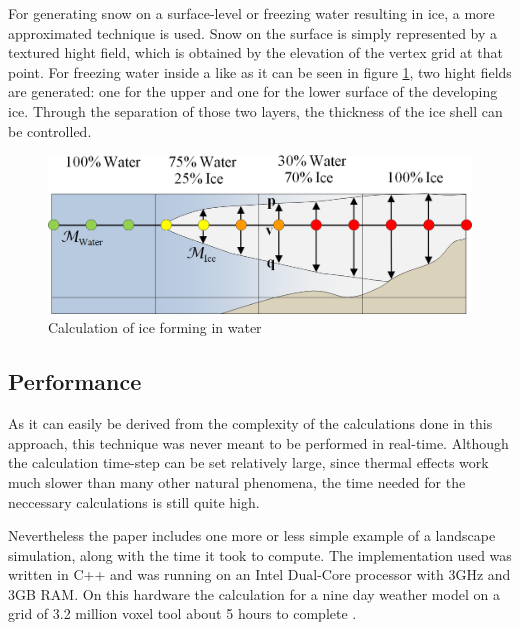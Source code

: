 For generating snow on a surface-level or freezing water resulting in ice, a more approximated technique is used. Snow on the surface is simply represented by a textured hight field, which is obtained by the elevation of the vertex grid at that point. For freezing water inside a like as it can be seen in figure \ref{fig:iceinwater}, two hight fields are generated: one for the upper and one for the lower surface of the developing ice. Through the separation of those two layers, the thickness of the ice shell can be controlled.

\begin{figure}[htb]
	\centering
	\includegraphics[width=\linewidth]{BF01/i_1.png}
	\caption{Calculation of ice forming in water}
	\label{fig:iceinwater}
\end{figure}

\subsection{Performance}
As it can easily be derived from the complexity of the calculations done in this approach, this technique was never meant to be performed in real-time. Although the calculation time-step can be set relatively large, since thermal effects work much slower than many other natural phenomena, the time needed for the neccessary calculations is still quite high.

Nevertheless the paper includes one more or less simple example of a landscape simulation, along with the time it took to compute. The implementation used was written in C++ and was running on an Intel Dual-Core processor with 3GHz and 3GB RAM. On this hardware the calculation for a nine day weather model on a grid of 3.2 million voxel tool about 5 hours to complete \cite{benes2001layered}.